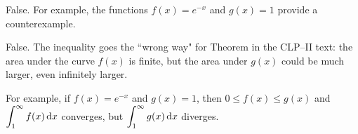 \begin{answer}
False. For example, the functions $f(x)=e^{-x}$ and $g(x)=1$ provide a counterexample.


\end{answer}

\begin{solution}
False. The inequality goes the ``wrong way" for Theorem 
 in the CLP--II text: the area under the curve $f(x)$ is finite, but the area under $g(x)$ could be much larger, even infinitely larger.

 For example, if $f(x)=e^{-x}$ and $g(x)=1$,
then $0 \leq f(x) \leq g(x)$ and $\displaystyle\int_{1}^{\infty} f(x) \,\mathrm{d}x$ converges, but
$\displaystyle\int_{1}^{\infty} g(x) \,\mathrm{d}x$ diverges.
\end{solution}

